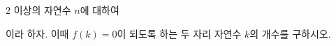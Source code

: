 $2$ 이상의 자연수 $n$에 대하여\par\smallskip{}\par\smallskip\noindent 이라 하자. 이때 $f(k)=0$이 되도록 하는 두 자리 자연수 $k$의 개수를 구하시오.

